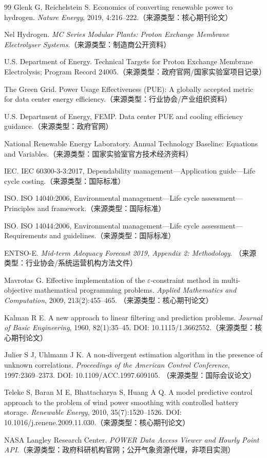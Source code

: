 \begin{thebibliography}{99}
Glenk G, Reichelstein S. Economics of converting renewable power to hydrogen.
\emph{Nature Energy}, 2019, 4:216--222.（来源类型：核心期刊论文）

Nel Hydrogen. \emph{MC Series Modular Plants: Proton Exchange Membrane
Electrolyser Systems}.（来源类型：制造商公开资料）

U.S. Department of Energy. Technical Targets for Proton Exchange Membrane
Electrolysis; Program Record 24005.（来源类型：政府官网/国家实验室项目记录）

The Green Grid. Power Usage Effectiveness (PUE): A globally accepted metric for
data center energy efficiency.（来源类型：行业协会/产业组织资料）

U.S. Department of Energy, FEMP. Data center PUE and cooling efficiency
guidance.（来源类型：政府官网）

National Renewable Energy Laboratory. Annual Technology Baseline: Equations
and Variables.（来源类型：国家实验室官方技术经济资料）

IEC. IEC 60300-3-3:2017, Dependability management---Application guide---Life
cycle costing.（来源类型：国际标准）

ISO. ISO 14040:2006, Environmental management---Life cycle assessment---
Principles and framework.（来源类型：国际标准）

ISO. ISO 14044:2006, Environmental management---Life cycle assessment---
Requirements and guidelines.（来源类型：国际标准）

ENTSO-E. \emph{Mid-term Adequacy Forecast 2019, Appendix 2: Methodology}.
（来源类型：行业协会/系统运营机构方法文件）

Mavrotas G. Effective implementation of the $\varepsilon$-constraint method in
multi-objective mathematical programming problems. \emph{Applied Mathematics
and Computation}, 2009, 213(2):455--465.
（来源类型：核心期刊论文）

Kalman R E. A new approach to linear filtering and prediction problems.
\emph{Journal of Basic Engineering}, 1960, 82(1):35--45.
DOI: 10.1115/1.3662552.（来源类型：核心期刊论文）

Julier S J, Uhlmann J K. A non-divergent estimation algorithm in the presence
of unknown correlations. \emph{Proceedings of the American Control
Conference}, 1997:2369--2373. DOI: 10.1109/ACC.1997.609105.
（来源类型：国际会议论文）

Teleke S, Baran M E, Bhattacharya S, Huang A Q. A model predictive control
approach to the problem of wind power smoothing with controlled battery
storage. \emph{Renewable Energy}, 2010, 35(7):1520--1526.
DOI: 10.1016/j.renene.2009.11.030.（来源类型：核心期刊论文）

NASA Langley Research Center. \emph{POWER Data Access Viewer and Hourly Point
API}.（来源类型：政府科研机构官网；公开气象资源代理，非项目实测）

\end{thebibliography}
